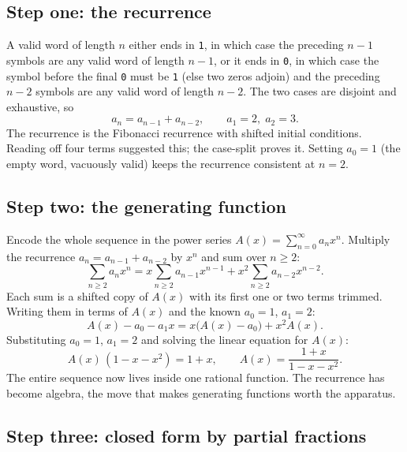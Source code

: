 \subsection{Step one: the recurrence}

A valid word of length $n$ either ends in \texttt{1}, in which case the
preceding $n - 1$ symbols are any valid word of length $n - 1$, or it
ends in \texttt{0}, in which case the symbol before the final \texttt{0}
must be \texttt{1} (else two zeros adjoin) and the preceding $n - 2$
symbols are any valid word of length $n - 2$. The two cases are
disjoint and exhaustive, so
\[
a_{n} = a_{n-1} + a_{n-2}, \qquad a_{1} = 2,\; a_{2} = 3.
\]
The recurrence is the Fibonacci recurrence with shifted initial
conditions. Reading off four terms suggested this; the case-split proves
it. Setting $a_{0} = 1$ (the empty word, vacuously valid) keeps the
recurrence consistent at $n = 2$.

\subsection{Step two: the generating function}

Encode the whole sequence in the power series $A(x) = \sum_{n=0}^{\infty}
a_{n} x^{n}$. Multiply the recurrence $a_{n} = a_{n-1} + a_{n-2}$ by
$x^{n}$ and sum over $n \geq 2$:
\[
\sum_{n \geq 2} a_{n} x^{n} = x \sum_{n \geq 2} a_{n-1} x^{n-1} + x^{2}
\sum_{n \geq 2} a_{n-2} x^{n-2}.
\]
Each sum is a shifted copy of $A(x)$ with its first one or two terms
trimmed. Writing them in terms of $A(x)$ and the known $a_{0} = 1$,
$a_{1} = 2$:
\[
A(x) - a_{0} - a_{1} x = x\bigl(A(x) - a_{0}\bigr) + x^{2} A(x).
\]
Substituting $a_{0} = 1$, $a_{1} = 2$ and solving the linear equation
for $A(x)$:
\[
A(x)\,(1 - x - x^{2}) = 1 + x, \qquad A(x) = \frac{1 + x}{1 - x -
x^{2}}.
\]
The entire sequence now lives inside one rational function. The
recurrence has become algebra, the move that makes generating functions
worth the apparatus.

\subsection{Step three: closed form by partial fractions}

